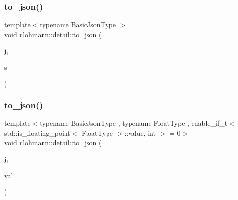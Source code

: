 \subsubsection{\texorpdfstring{to\+\_\+json()}{to\_json()}\hspace{0.1cm}{\footnotesize\ttfamily [3/17]}}
{\footnotesize\ttfamily template$<$typename Basic\+Json\+Type $>$ \\
\hyperlink{namespacenlohmann_1_1detail_a59fca69799f6b9e366710cb9043aa77d}{void} nlohmann\+::detail\+::to\+\_\+json (\begin{DoxyParamCaption}\item[{Basic\+Json\+Type \&}]{j,  }\item[{typename Basic\+Json\+Type\+::string\+\_\+t \&\&}]{s }\end{DoxyParamCaption})}

\mbox{\label{namespacenlohmann_1_1detail_a22bffdc8bc7e43af380ba2050696b230}} 
\subsubsection{\texorpdfstring{to\+\_\+json()}{to\_json()}\hspace{0.1cm}{\footnotesize\ttfamily [4/17]}}
{\footnotesize\ttfamily template$<$typename Basic\+Json\+Type , typename Float\+Type , enable\+\_\+if\+\_\+t$<$ std\+::is\+\_\+floating\+\_\+point$<$ Float\+Type $>$\+::value, int $>$  = 0$>$ \\
\hyperlink{namespacenlohmann_1_1detail_a59fca69799f6b9e366710cb9043aa77d}{void} nlohmann\+::detail\+::to\+\_\+json (\begin{DoxyParamCaption}\item[{Basic\+Json\+Type \&}]{j,  }\item[{Float\+Type}]{val }\end{DoxyParamCaption})\hspace{0.3cm}{\ttfamily [noexcept]}}

\mbox{\label{namespacenlohmann_1_1detail_ae5fd66b5517b3b5a6c6b9fd9f29ba8dc}} 
